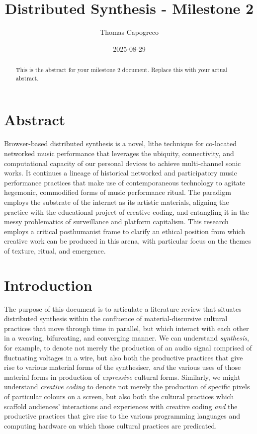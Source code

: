 \documentclass[
  american,
  12pt,
]{article}
\title{Distributed Synthesis - Milestone 2}
\author{Thomas Capogreco}
\date{2025-08-29}
\begin{document}
\maketitle
\begin{abstract}
This is the abstract for your milestone 2 document. Replace this with
your actual abstract.
\end{abstract}

{
\hypersetup{linkcolor=}
\setcounter{tocdepth}{3}
\tableofcontents
}
\section*{Abstract}\label{abstract}

Browser-based distributed synthesis is a novel, lithe technique for
co-located networked music performance that leverages the ubiquity,
connectivity, and computational capacity of our personal devices to
achieve multi-channel sonic works. It continues a lineage of historical
networked and participatory music performance practices that make use of
contemporaneous technology to agitate hegemonic, commodified forms of
music performance ritual. The paradigm employs the substrate of the
internet as its artistic materials, aligning the practice with the
educational project of creative coding, and entangling it in the messy
problematics of surveillance and platform capitalism. This research
employs a critical posthumanist frame to clarify an ethical position
from which creative work can be produced in this arena, with particular
focus on the themes of texture, ritual, and emergence.

\section*{Introduction}\label{introduction}

The purpose of this document is to articulate a literature review that
situates distributed synthesis within the confluence of
material-discursive cultural practices that move through time in
parallel, but which interact with each other in a weaving, bifurcating,
and converging manner. We can understand \emph{synthesis}, for example,
to denote not merely the production of an audio signal comprised of
fluctuating voltages in a wire, but also both the productive practices
that give rise to various material forms of the synthesiser, \emph{and}
the various uses of those material forms in production of
\emph{expressive} cultural forms. Similarly, we might understand
\emph{creative coding} to denote not merely the production of specific
pixels of particular colours on a screen, but also both the cultural
practices which scaffold audiences' interactions and experiences with
creative coding \emph{and} the productive practices that give rise to
the various programming languages and computing hardware on which those
cultural practices are predicated.
\end{document}
